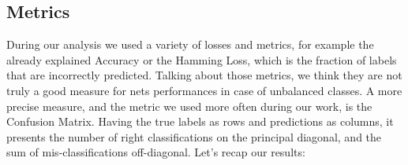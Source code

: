 \documentclass{article}
\begin{document}

\subsection{Metrics}
During our analysis we used a variety of losses and metrics, for example the already explained Accuracy or the Hamming Loss, which is the fraction of labels that are incorrectly predicted.
Talking about those metrics, we think they are not truly a good measure for nets performances in case of unbalanced classes.
A more precise measure, and the metric we used more often during our work, is the Confusion Matrix.
Having the true labels as rows and predictions as columns, it presents the number of right classifications on the principal diagonal, and the sum of mis-classifications off-diagonal. 
Let's recap our results:
\end{document}
